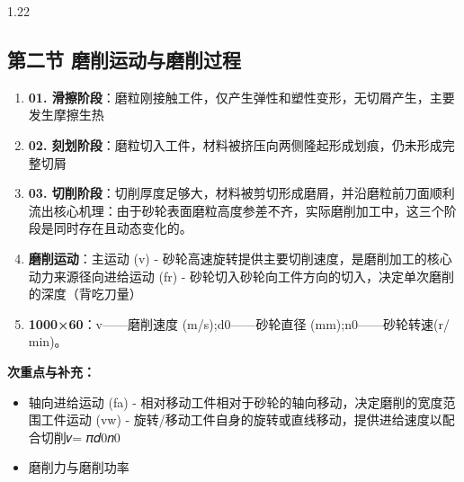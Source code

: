 \documentclass[12pt,a4paper]{article}
\begin{document}
\begin{spacing}{1.22}
\subsection{第二节 磨削运动与磨削过程}
\begin{tcolorbox}[colback=yellow!6,colframe=red!55!black,title=重点,left=1mm,right=1mm]
\begin{enumerate}[leftmargin=2.2em,label=\arabic*.]
  \item \textbf{01. 滑擦阶段}：磨粒刚接触工件，仅产生弹性和塑性变形，无切屑产生，主要发生摩擦生热
  \item \textbf{02. 刻划阶段}：磨粒切入工件，材料被挤压向两侧隆起形成划痕，仍未形成完整切屑
  \item \textbf{03. 切削阶段}：切削厚度足够大，材料被剪切形成磨屑，并沿磨粒前刀面顺利流出核心机理：由于砂轮表面磨粒高度参差不齐，实际磨削加工中，这三个阶段是同时存在且动态变化的。
  \item \textbf{磨削运动}：主运动 (v) - 砂轮高速旋转提供主要切削速度，是磨削加工的核心动力来源径向进给运动 (fr) - 砂轮切入砂轮向工件方向的切入，决定单次磨削的深度（背吃刀量）
  \item \textbf{1000×60}：v——磨削速度 (m/s);d0——砂轮直径 (mm);n0——砂轮转速(r/ min)。
\end{enumerate}
\end{tcolorbox}
\noindent\textbf{次重点与补充：}
\begin{itemize}[leftmargin=2.2em,label=--]
  \item 轴向进给运动 (fa) - 相对移动工件相对于砂轮的轴向移动，决定磨削的宽度范围工件运动 (vw) - 旋转/移动工件自身的旋转或直线移动，提供进给速度以配合切削𝑣= 𝜋𝑑0𝑛0
  \item 磨削力与磨削功率
\end{itemize}


\end{spacing}
\end{document}
